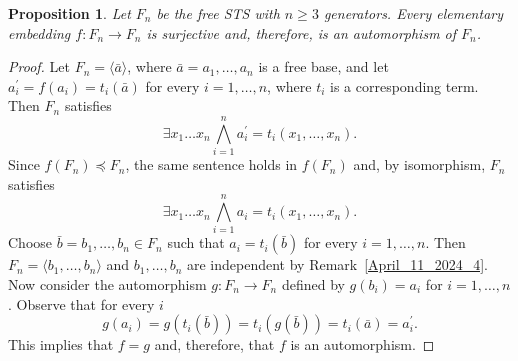 \documentclass[10pt,a4paper]{article}
\theoremstyle{note}
\newtheorem{prop}[thm]{Proposition}
\begin{document}
	\begin{prop}\label{April_11_2024_5} Let $F_n$ be the free STS with $n\geq 3$ generators. Every elementary embedding $f:F_n\rightarrow F_n$ is surjective and, therefore, is an automorphism of $F_n$.
	\end{prop}

	\begin{proof} Let  $F_n=\langle \bar{a}\rangle$, where $\bar{a}=a_1,\ldots,a_n$ is a free base,  and let $a_i^\prime =f(a_i) = t_i(\bar{a})$  for every   $i=1,\ldots,n$, where $t_i$ is a corresponding term. Then  $F_n$ satisfies
		$$\exists x_1\ldots x_n  \bigwedge_{i=1}^n  a_i^\prime = t_i(x_1,\ldots,x_n).$$
		Since $f(F_n)\preceq F_n$, the same sentence holds in $f(F_n)$ and, by isomorphism,  $F_n$ satisfies
		$$\exists x_1\ldots x_n  \bigwedge_{i=1}^n  a_i= t_i(x_1,\ldots,x_n).$$
		Choose $\bar{b}= b_1,\ldots,b_n\in F_n$  such that   $a_i= t_i(\bar{b})$  for every $i=1,\ldots,n$. Then  $F_n=\langle b_1,\ldots,b_n\rangle$  and $b_1,\ldots,b_n$ are independent by Remark~\ref{April_11_2024_4}. Now consider the automorphism $g:F_n\rightarrow F_n$  defined by  $g(b_i)=a_i$  for  $i=1,\ldots,n$. Observe that  for every $i$
		$$g(a_i)= g(t_i(\bar{b}))= t_i(g(\bar{b}))=t_i(\bar{a})= a_i^\prime.$$
		This implies that $f=g$ and, therefore, that $f$ is an automorphism.
	\end{proof}
\end{document}
